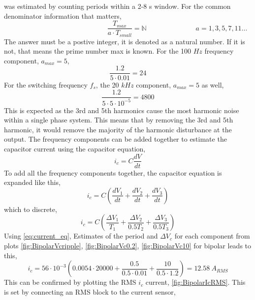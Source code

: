 \documentclass[12pt,twoside]{scrartcl}
\begin{document}
was estimated by counting periods within a 2-8 s window. For the common denominator information that matters,
\begin{equation} 
    \hspace{6cm} \dfrac{T_{max}}{a \cdot T_{small}} = \mathbb{N} \hspace{3cm} a = 1,3,5,7,11 ...
\end{equation}
The answer must be a postive integer, it is denoted as a natural number. 
If it is not, that means the prime number max is known. For the 100 $Hz$ frequency component, $a_{max} = 5$,
\begin{equation}
    \dfrac{1.2}{5 \cdot 0.01} = 24 \tag*{}
\end{equation}
For the switching frequency $f_s$, the 20 $kHz$ component, $a_{max} = 5$ as well,
\begin{equation}
    \dfrac{1.2}{5 \cdot 5 \cdot 10^{-5}} = 4800 \tag*{}
\end{equation}
This is expected as the 3rd and 5th harmonics cause the most harmonic 
noise within a single phase system. This 
means that by removing the 3rd and 
5th harmonic, it would remove the majority of the harmonic disturbance at the output.
\newline
\newline
\noindent
The frequency components can be added together to estimate the capacitor current using the capacitor equation,
\begin{equation}
    i_{c} = C\dfrac{dV}{dt}
\end{equation}
To add all the frequency components together, the capacitor equation is expanded like this,
\begin{equation}
    i_c = C\left(\dfrac{dV_1}{dt} + \dfrac{dV_2}{dt} + \dfrac{dV_3}{dt}\right)
\end{equation}
which to discrete,
\begin{equation}
    i_c = C\left(\dfrac{\Delta V_1}{T_1} + \dfrac{\Delta V_2}{0.5T_2} + \dfrac{\Delta V_3}{0.5T_3}\right)
    \label{eq:current_eq}
\end{equation}
Using \ref{eq:current_eq}, Estimates of the period and $\Delta V_c$ for each component from plots \ref{fig:BipolarVcripple}, \ref{fig:BipolarVc0.2}, \ref{fig:BipolarVc10} for bipolar leads to this,
\begin{equation}
    i_c = 56\cdot 10^{-3}\left(0.0054\cdot 20000 + \dfrac{0.5}{0.5 \cdot 0.01} + \dfrac{10}{0.5 \cdot 1.2}\right) = 12.58 \: A_{RMS} \tag*{}
\end{equation}
This can be confirmed by plotting the RMS $i_c$ current, \ref{fig:BipolarIcRMS}. This is set by connecting an RMS block to the current sensor,
\end{document}
